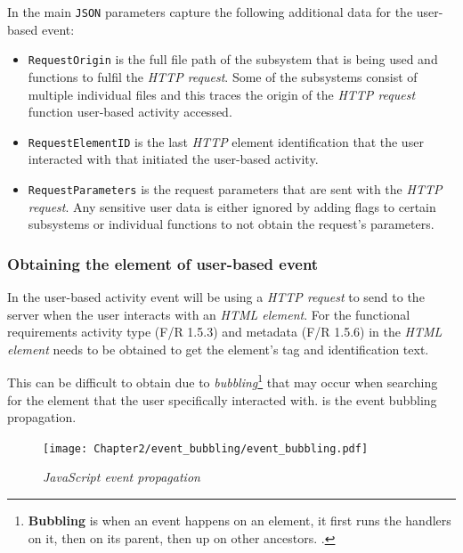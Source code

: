 In  the main \texttt{JSON} parameters capture the following additional data for the user-based event:

\begin{itemize}
	\item \texttt{RequestOrigin} is the full file path of the subsystem that is being used and functions to fulfil the \textit{HTTP request}. Some of the subsystems consist of multiple individual files and this traces the origin of the \textit{HTTP request} function user-based activity accessed.
	\item \texttt{RequestElementID} is the last \textit{HTTP} element identification that the user interacted with that initiated the user-based activity.
	\item \texttt{RequestParameters} is the request parameters that are sent with the \textit{HTTP request}. Any sensitive user data is either ignored by adding flags to certain subsystems or individual functions to not obtain the request's parameters.
\end{itemize}

\subsubsection{Obtaining the element of user-based event}\label{sec:ch3_ElementObtaining}
In  the user-based activity event will be using a \textit{HTTP request} to send to the server when the user interacts with an \textit{HTML element}. For the functional requirements activity type (F/R 1.5.3) and metadata (F/R 1.5.6) in  the \textit{HTML element} needs to be obtained to get the element's tag and identification text.\par This can be difficult to obtain due to \textit{bubbling}\footnote{\textbf{Bubbling} is when an event happens on an element, it first runs the handlers on it, then on its parent, then up on other ancestors. \cite{EventBubbling}.} that may occur when searching for the element that the user specifically interacted with.  is the event bubbling propagation.

\begin{figure}[!htb]
	\centering %
	\texttt{[image: Chapter2/event\_bubbling/event\_bubbling.pdf]}
	\caption[JavaScript event propagation]
	{\textit{JavaScript event propagation~\cite{EventBubbling}}}\label{fig:ch2_event_bubbling}
\end{figure}

